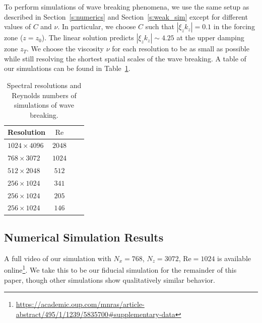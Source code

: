\documentclass[
        fleqn,
        usenatbib,
    ]{mnras}
\newcommand*{\abs}[1]{\left|#1\right|}
\begin{document}

To perform simulations of wave breaking phenomena, we use the same setup as
described in Section~\ref{s:numerics} and Section~\ref{s:weak_sim} except for
different values of $C$ and $\nu$. In particular, we choose $C$ such that
$\abs{\xi_z k_z} = 0.1$ in the forcing zone ($z = z_0$). The linear solution
predicts $\abs{\xi_z k_z} \sim 4.25$ at the upper damping zone $z_T$.
We choose the viscosity $\nu$ for each resolution to be as
small as possible while still resolving the shortest spatial scales of the wave
breaking. A table of our simulations can be found in Table~\ref{tab:params}.
\begin{table}
    \centering
    \begin{tabular}{l c c c}
        Resolution & $\mathrm{Re}$\\\bottomrule
        $1024 \times 4096$ & $2048$\\
        $768 \times 3072$ & $1024$\\
        $512 \times 2048$ & $512$\\
        $256 \times 1024$ & $341$\\
        $256 \times 1024$ & $205$\\
        $256 \times 1024$ & $146$\\
    \end{tabular}
    \caption{Spectral resolutions and Reynolds numbers of simulations of wave
    breaking.}\label{tab:params}
\end{table}

\subsection{Numerical Simulation Results}\label{ss:nl_ns}

A full video of our simulation with $N_x = 768$, $N_z = 3072$, $\mathrm{Re} =
1024$ is available
online\footnote{\url{https://academic.oup.com/mnras/article-abstract/495/1/1239/5835700\#supplementary-data}}.
We take this to be our fiducial simulation for the remainder of this paper,
though other simulations show qualitatively similar behavior.
\end{document}
